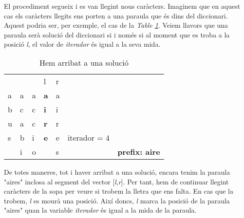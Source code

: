 \documentclass[titlepage]{article}
\begin{document}
El procediment segueix i es van llegint nous caràcters. Imaginem que en aquest cas els caràcters llegits ens porten a una paraula que és dins del diccionari. Aquest podria ser, per exemple, el cas de la \textit{Table \ref{fig:sortedVector3}}. Veiem llavors que una paraula serà solució del diccionari si i només si al moment que es troba a la posició \textit{l}, el valor de \textit{iterador} és igual a la seva mida.  

\begin{table}[H]
\begin{center}

\begin{tabular}{lllllll}
                        &                        &                        & l                      & r                      &          &                        \\ \cline{1-5}
\multicolumn{1}{|l|}{a} & \multicolumn{1}{l|}{a} & \multicolumn{1}{l|}{a} & \multicolumn{1}{l|}{\textbf{a}} & \multicolumn{1}{l|}{a} &          &                        \\
\multicolumn{1}{|l|}{b} & \multicolumn{1}{l|}{c} & \multicolumn{1}{l|}{c} & \multicolumn{1}{l|}{\textbf{i}} & \multicolumn{1}{l|}{i} &          &                        \\
\multicolumn{1}{|l|}{u} & \multicolumn{1}{l|}{a} & \multicolumn{1}{l|}{c} & \multicolumn{1}{l|}{\textbf{r}} & \multicolumn{1}{l|}{r} &          &                        \\
\multicolumn{1}{|l|}{s} & \multicolumn{1}{l|}{b} & \multicolumn{1}{l|}{i} & \multicolumn{1}{l|}{\textbf{e}} & \multicolumn{1}{l|}{e} & iterador = 4 &                        \\ \cline{1-1} \cline{4-4}
\multicolumn{1}{l|}{}   & \multicolumn{1}{l|}{i} & \multicolumn{1}{l|}{o} & \multicolumn{1}{l|}{}  & \multicolumn{1}{l|}{s} &          & \textbf{prefix: aire} \\ \cline{2-3} \cline{5-5}
\end{tabular}
    \caption{Hem arribat a una solució}
            \label{fig:sortedVector3}
\end{center}
\end{table}

De totes maneres, tot i haver arribat a una solució, encara tenim la paraula "aires" inclosa al segment del vector [\textit{l},\textit{r}]. Per tant, hem de continuar llegint caràcters de la sopa per veure si trobem la lletra que ens falta. En cas que la trobem, \textit{l} es mourà una posició. Així doncs, \textit{l} marca la posició de la paraula "aires" quan la variable \textit{iterador} és igual a la mida de la paraula.
\end{document}
